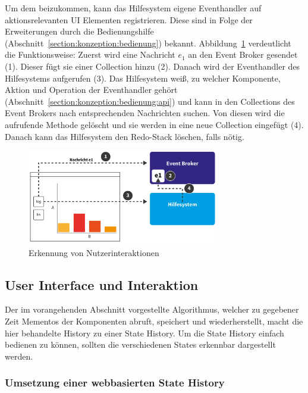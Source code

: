 \documentclass[
	headsepline,
	footsepline,
	fontsize=12pt,
	bibliography=totoc
]{scrbook}
\begin{document}
Um dem beizukommen, kann das Hilfesystem eigene Eventhandler auf aktionsrelevanten UI Elementen registrieren. Diese sind in Folge der Erweiterungen durch die Bedienungshilfe (Abschnitt~\ref{section:konzeption:bedienung}) bekannt. Abbildung~\ref{figure:undo-ablauf} verdeutlicht die Funktionsweise: Zuerst wird eine Nachricht $e_1$ an den Event Broker gesendet (1). Dieser fügt sie einer Collection hinzu (2). Danach wird der Eventhandler des Hilfesystems aufgerufen (3). Das Hilfesystem weiß, zu welcher Komponente, Aktion und Operation der Eventhandler gehört (Abschnitt~\ref{section:konzeption:bedienung:api}) und kann in den Collections des Event Brokers nach entsprechenden Nachrichten suchen. Von diesen wird die aufrufende Methode gelöscht und sie werden in eine neue Collection eingefügt (4). Danach kann das Hilfesystem den Redo-Stack löschen, falls nötig.

\begin{figure}[htbp]
   \centering
   \includegraphics[width=0.75\textwidth]{images/konzeption-undo-ablauf.png}
   \caption{Erkennung von Nutzerinteraktionen}
   \label{figure:undo-ablauf}
\end{figure}

\subsection{User Interface und Interaktion}
\label{section:konzeption:history:ui}


Der im vorangehenden Abschnitt vorgestellte Algorithmus, welcher zu gegebener Zeit Mementos der Komponenten abruft, speichert und wiederherstellt, macht die hier behandelte History zu einer State History. Um die State History einfach bedienen zu können, sollten die verschiedenen States erkennbar dargestellt werden.

\subsubsection{Umsetzung einer webbasierten State History}
\end{document}
